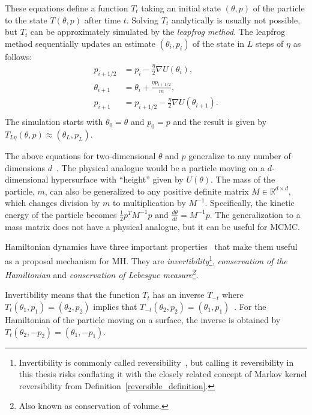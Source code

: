 \documentclass[english,twoside,openright]{HYgraduMLDS}
\newcommand{\R}{\mathbb{R}}
\begin{document}
These equations define a function \(T_t\) taking an initial state 
\((\theta, p)\) of the particle to the state \(T(\theta, p)\) after time \(t\).
Solving \(T_t\) analytically is usually not possible, but \(T_t\) can be 
approximately simulated by the \emph{leapfrog method}. The leapfrog method sequentially
updates an estimate \((\theta_i, p_i)\) of the state in \(L\) steps of \(\eta\)
as follows:
\begin{align*}
    p_{i+1/2} &= p_i - \frac{\eta}{2}\nabla U(\theta_i), \\
    \theta_{i+1} &= \theta_i + \frac{\eta p_{i+1/2}}{m}, \\
    p_{i+1} &= p_{i+1/2} - \frac{\eta}{2}\nabla U(\theta_{i+1}). \\
\end{align*}
The simulation starts with \(\theta_0 = \theta\) and \(p_0 = p\) and the 
result is given by \(T_{L\eta}(\theta, p) \approx (\theta_L, p_L)\).

The above equations for two-dimensional \(\theta\) and \(p\) generalize to
any number of dimensions \(d\)~\cite{neal2012mcmc}. The physical analogue would be a particle moving
on a \(d\)-dimensional hypersurface with ``height'' given by \(U(\theta)\).
The mass of the particle, \(m\), can also be generalized to any positive
definite matrix \(M \in \R^{d\times d}\), which changes division by
\(m\) to multiplication by \(M^{-1}\). Specifically, the kinetic energy of the
particle becomes \(\frac{1}{2}p^{T}M^{-1}p\) and
\(\frac{d\theta}{dt} = M^{-1}p\). The generalization to a mass matrix does not
have a physical analogue, but it can be useful for MCMC.

Hamiltonian dynamics have three important properties~\cite{neal2012mcmc} 
that make them useful as a
proposal mechanism for MH. They are \emph{invertibility}\footnote{
  Invertibility is commonly called reversibility~\cite{neal2012mcmc}, but
  calling it reversibility in this thesis risks conflating it with
  the closely related concept of Markov kernel reversibility from
  Definition~\ref{reversible_definition}.
},
\emph{conservation of the Hamiltonian} and
\emph{conservation of Lebesgue measure}\footnote{Also
  known as conservation of volume.
}.

Invertibility means that the function \(T_t\) has an inverse \(T_{-t}\) where
\(T_t(\theta_1, p_1) = (\theta_2, p_2)\) implies that
\(T_{-t}(\theta_2, p_2) = (\theta_1, p_1)\)~\cite{neal2012mcmc}.
For the Hamiltonian of the particle moving on a surface, the inverse 
is obtained by \(T_t(\theta_2, -p_2) = (\theta_1, -p_1)\).
\end{document}

